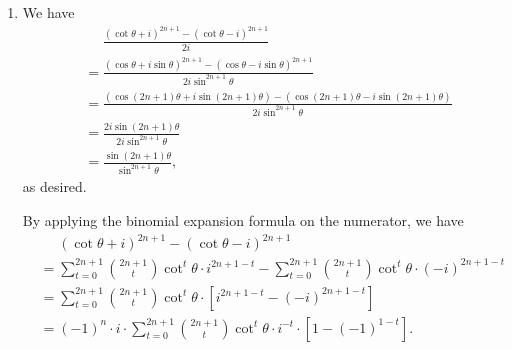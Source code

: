 \Question{\currfilebase}

\begin{enumerate}
    \item We have
          \begin{align*}
               & \phantom{=} \frac{(\cot \theta + i)^{2n + 1} - (\cot \theta - i)^{2n + 1}}{2i}                                                                 \\
               & = \frac{\left(\cos \theta + i \sin \theta\right)^{2n + 1} - (\cos \theta - i \sin \theta)^{2n + 1}}{2i \sin^{2n + 1} \theta}                   \\
               & = \frac{\left(\cos (2n + 1) \theta + i \sin (2n + 1) \theta\right) - (\cos (2n + 1) \theta - i \sin (2n + 1) \theta)}{2i \sin^{2n + 1} \theta} \\
               & = \frac{2i \sin (2n + 1) \theta}{2i \sin^{2n + 1} \theta}                                                                                      \\
               & = \frac{\sin (2n + 1) \theta}{\sin^{2n + 1} \theta},
          \end{align*}
          as desired.

          By applying the binomial expansion formula on the numerator, we have
          \begin{align*}
               & \phantom{=} (\cot \theta + i)^{2n + 1} - (\cot \theta - i)^{2n + 1}                                                                                          \\
               & = \sum_{t = 0}^{2n + 1} \binom{2n + 1}{t} \cot^t \theta \cdot i^{2n + 1 - t} - \sum_{t = 0}^{2n + 1} \binom{2n + 1}{t} \cot^t \theta \cdot (-i)^{2n + 1 - t} \\
               & = \sum_{t = 0}^{2n + 1} \binom{2n + 1}{t} \cot^t \theta \cdot \left[i^{2n + 1 - t} - (-i)^{2n + 1 - t}\right]                                                \\
               & = (-1)^n \cdot i \cdot  \sum_{t = 0}^{2n + 1} \binom{2n + 1}{t} \cot^t \theta \cdot i^{-t} \cdot \left[1 - (-1)^{1 - t}\right].
          \end{align*}


\end{enumerate}

